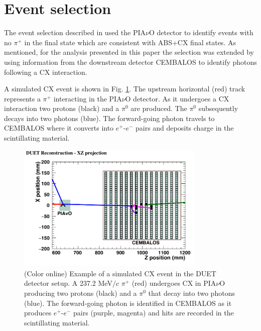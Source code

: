 \section{\label{sec:selection}Event selection}
The event selection described in \cite{duet} used the PIA$\nu$O detector to identify events with no $\pi^{+}$ in the final state which are consistent with ABS+CX final states. As mentioned, for the analysis presented in this paper the selection was extended by using information from the downstream detector CEMBALOS to identify photons following a CX interaction. 

A simulated CX event is shown in Fig. \ref{fig:event}. The upstream horizontal (red) track represents a $\pi^{+}$ interacting in the PIA$\nu$O detector. As it undergoes a CX interaction two protons (black) and a $\pi^{0}$ are produced. The $\pi^{0}$ subsequently decays into two photons (blue). The forward-going photon travels to CEMBALOS where it converts into $e^{+}$-$e^{-}$ pairs and deposits charge in the scintillating material.

\begin{figure}[ht]
\includegraphics[width=90mm]{figures/event_display_without_diagram.pdf}
\caption{(Color online) Example of a simulated CX event in the DUET detector setup. A 237.2 MeV$/c$ $\pi^+$ (red) undergoes CX in PIA$\nu$O producing two protons (black) and a $\pi^0$ that decay into two photons (blue). The forward-going photon is identified in CEMBALOS as it produces $e^{+}$-$e^{-}$ pairs (purple, magenta) and hits are recorded in the scintillating material.}
\label{fig:event}
\end{figure}

